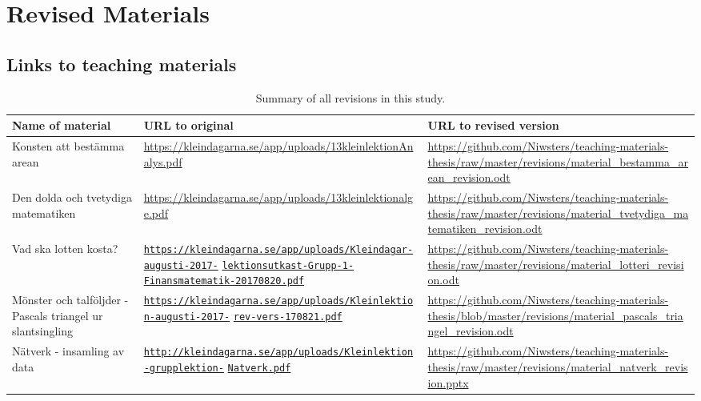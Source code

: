 \chapter{Revised Materials}

\section{Links to teaching materials}
\bgroup
\def\arraystretch{1.5}
\begin{table}[H]
\begin{adjustwidth}{-2cm}{}
\centering
\caption{Summary of all revisions in this study.}
  \begin{tabular}{p{4.5cm}p{7cm}p{6.5cm}} \hline\hline
  \textbf{Name of material} & \textbf{URL to original} & \textbf{URL to revised version} \\ \hline
  Konsten att bestämma arean & \url{https://kleindagarna.se/app/uploads/13kleinlektionAnalys.pdf} & \url{https://github.com/Niwsters/teaching-materials-thesis/raw/master/revisions/material_bestamma_arean_revision.odt} \\ \hline
  Den dolda och tvetydiga matematiken & \url{https://kleindagarna.se/app/uploads/13kleinlektionalge.pdf} & \url{https://github.com/Niwsters/teaching-materials-thesis/raw/master/revisions/material_tvetydiga_matematiken_revision.odt} \\ \hline
  Vad ska lotten kosta? & \href{https://kleindagarna.se/app/uploads/Kleindagar-augusti-2017-lektionsutkast-Grupp-1-Finansmatematik-20170820.pdf}{\nolinkurl{https://kleindagarna.se/app/uploads/Kleindagar-augusti-2017-}} \href{https://kleindagarna.se/app/uploads/Kleindagar-augusti-2017-lektionsutkast-Grupp-1-Finansmatematik-20170820.pdf}{\nolinkurl{lektionsutkast-Grupp-1-}} \href{https://kleindagarna.se/app/uploads/Kleindagar-augusti-2017-lektionsutkast-Grupp-1-Finansmatematik-20170820.pdf}{\nolinkurl{Finansmatematik-20170820.pdf}}& \url{https://github.com/Niwsters/teaching-materials-thesis/raw/master/revisions/material_lotteri_revision.odt}\\ \hline
  Mönster och talföljder - Pascals triangel ur slantsingling & \href{https://kleindagarna.se/app/uploads/Kleinlektion-augusti-2017-rev-vers-170821.pdf}{\nolinkurl{https://kleindagarna.se/app/uploads/Kleinlektion-augusti-2017-}} \href{https://kleindagarna.se/app/uploads/Kleinlektion-augusti-2017-rev-vers-170821.pdf}{\nolinkurl{rev-vers-170821.pdf}} & \url{https://github.com/Niwsters/teaching-materials-thesis/blob/master/revisions/material_pascals_triangel_revision.odt} \\ \hline
  Nätverk - insamling av data & \href{http://kleindagarna.se/app/uploads/Kleinlektion-grupplektion-Natverk.pdf}{\nolinkurl{http://kleindagarna.se/app/uploads/Kleinlektion-grupplektion-}} \href{http://kleindagarna.se/app/uploads/Kleinlektion-grupplektion-Natverk.pdf}{\nolinkurl{Natverk.pdf}} & \url{https://github.com/Niwsters/teaching-materials-thesis/raw/master/revisions/material_natverk_revision.pptx}\\ \hline
\end{tabular}
\label{app:revisions}
\end{adjustwidth}
\end{table}
\egroup

